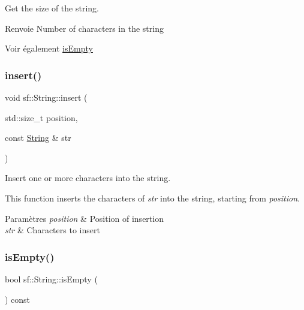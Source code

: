 Get the size of the string. 

\begin{DoxyReturn}{Renvoie}
Number of characters in the string
\end{DoxyReturn}
\begin{DoxySeeAlso}{Voir également}
\hyperlink{classsf_1_1String_a2ba26cb6945d2bbb210b822f222aa7f6}{is\+Empty} 
\end{DoxySeeAlso}
\mbox{\label{classsf_1_1String_ad0b1455deabf07af13ee79812e05fa02}} 
\subsubsection{\texorpdfstring{insert()}{insert()}}
{\footnotesize\ttfamily void sf\+::\+String\+::insert (\begin{DoxyParamCaption}\item[{std\+::size\+\_\+t}]{position,  }\item[{const \hyperlink{classsf_1_1String}{String} \&}]{str }\end{DoxyParamCaption})}



Insert one or more characters into the string. 

This function inserts the characters of {\itshape str} into the string, starting from {\itshape position}.


\begin{DoxyParams}{Paramètres}
{\em position} & Position of insertion \\
\hline
{\em str} & Characters to insert \\
\hline
\end{DoxyParams}
\mbox{\label{classsf_1_1String_a2ba26cb6945d2bbb210b822f222aa7f6}} 
\subsubsection{\texorpdfstring{is\+Empty()}{isEmpty()}}
{\footnotesize\ttfamily bool sf\+::\+String\+::is\+Empty (\begin{DoxyParamCaption}{ }\end{DoxyParamCaption}) const}



